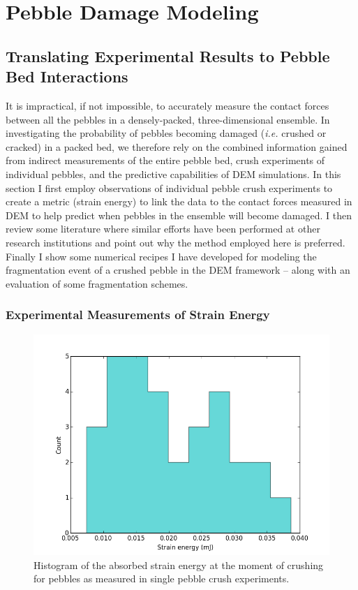 \section{Pebble Damage Modeling}\label{sec:failure-study}

\subsection{Translating Experimental Results to Pebble Bed Interactions}\label{sec:theoryStrainEnergy}

It is impractical, if not impossible, to accurately measure the contact forces between all the pebbles in a densely-packed, three-dimensional ensemble. In investigating the probability of pebbles becoming damaged (\textit{i.e.} crushed or cracked) in a packed bed, we therefore rely on the combined information gained from indirect measurements of the entire pebble bed, crush experiments of individual pebbles, and the predictive capabilities of DEM simulations. In this section I first employ observations of individual pebble crush experiments to create a metric (strain energy) to link the data to the contact forces measured in DEM to help predict when pebbles in the ensemble will become damaged. I then review some literature where similar efforts have been performed at other research institutions and point out why the method employed here is preferred. Finally I show some numerical recipes I have developed for modeling the fragmentation event of a crushed pebble in the DEM framework -- along with an evaluation of some fragmentation schemes. 

\subsubsection{Experimental Measurements of Strain Energy}
\begin{figure}[!t]
\centering
    \includegraphics[width=\doubleimagewidth]{chapters/figures/fzk-w-histogram.png}
    \caption{Histogram of the absorbed strain energy at the moment of crushing for \lis pebbles as measured in single pebble crush experiments.}
    \label{fig:fzk-w-hist}
\end{figure}

